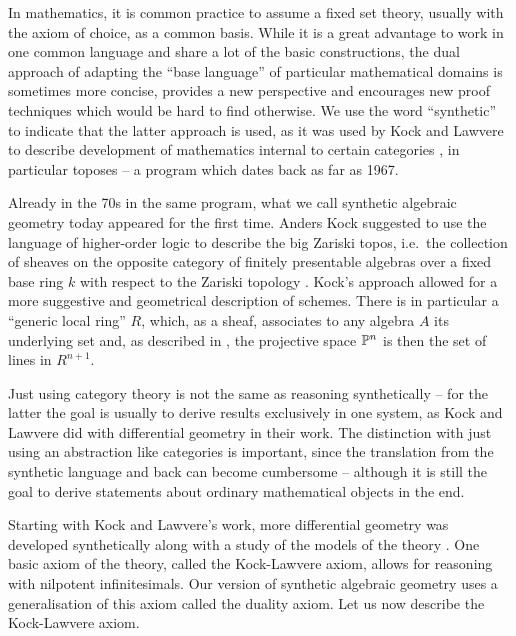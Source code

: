 
In mathematics, it is common practice to assume a fixed set theory, usually with the axiom of choice, as a common basis. While it is a great advantage to work in one common language and share a lot of the basic constructions, the dual approach of adapting the  ``base language'' of particular mathematical domains is sometimes more concise, provides a new perspective and encourages new proof techniques which would be hard to find otherwise.
We use the word ``synthetic'' to indicate that the latter approach is used,
as it was used by Kock and Lawvere to describe development of mathematics internal to certain categories \cite{lawvere-categorical-dynamics}, in particular toposes -- a program which dates back as far as 1967.

Already in the 70s in the same program, what we call  synthetic algebraic geometry today appeared for the first time. Anders Kock suggested to use the language of higher-order logic \cite{Church40} to describe the big Zariski topos, i.e.\ the collection of sheaves on the opposite category of finitely presentable algebras over a fixed base ring \(k\) with respect to the Zariski topology \cite{Kock74,kockreyes}. 
Kock's approach allowed for a more suggestive and geometrical description of schemes.
There is in particular a ``generic local ring'' $R$, which, as a sheaf, associates to any algebra $A$ its underlying set and, as described in \cite{kockreyes}, the projective space $\mathbb{P}^n$ is then the set of lines in $R^{n+1}$.

Just using category theory is not the same as reasoning synthetically -- for the latter the goal is usually to derive results exclusively in one system,
as Kock and Lawvere did with differential geometry in their work.
The distinction with just using an abstraction like categories is important, since the translation from the synthetic language and back can become cumbersome -- although it is still the goal to derive statements about ordinary mathematical objects in the end.

Starting with Kock and Lawvere's work, more differential geometry was developed synthetically \cite{kock-sdg} along with a study of the models of the theory \cite{moerdijk-reyes}.
One basic axiom of the theory, called the Kock-Lawvere axiom, allows for reasoning with nilpotent infinitesimals. Our version of synthetic algebraic geometry uses a generalisation of this axiom called the duality axiom. Let us now describe the Kock-Lawvere axiom.

